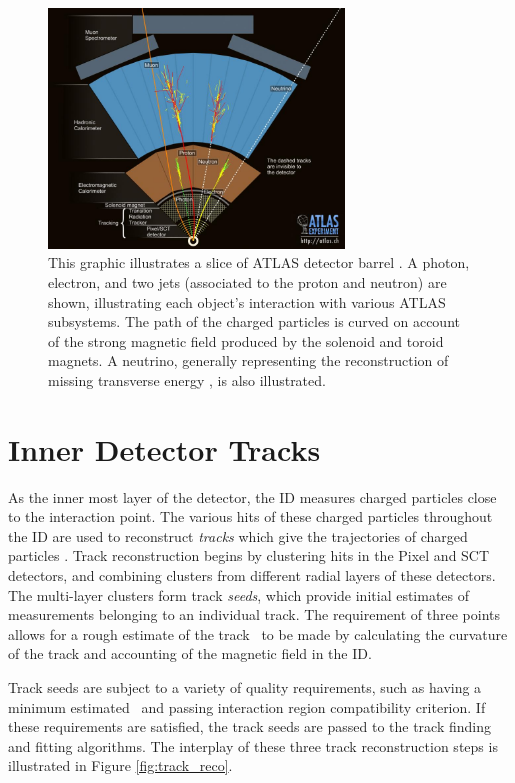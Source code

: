 \begin{figure}
        \centering
	\includegraphics[width=0.7\textwidth]{figures/ch5/detector_objects}
	\caption{This graphic illustrates a slice of ATLAS detector barrel \cite{detector_events}. A photon, electron, and two jets (associated to the proton and neutron) are shown, illustrating each object's interaction with various ATLAS subsystems. The path of the charged particles is curved on account of the strong magnetic field produced by the solenoid and toroid magnets. A neutrino, generally representing the reconstruction of missing transverse energy \met, is also illustrated.}
	\label{fig:detector_objects}
\end{figure}

\section{Inner Detector Tracks}
\label{sec:inner_det_tracks}
As the inner most layer of the detector, the ID measures charged particles close to the interaction point. The various hits of these charged particles throughout the ID are used to reconstruct \textit{tracks} which give the trajectories of charged particles \cite{track_finding}. Track reconstruction begins by clustering hits in the Pixel and SCT detectors, and combining clusters from different radial layers of these detectors. The multi-layer clusters form track \textit{seeds}, which provide initial estimates of measurements belonging to an individual track. The requirement of three points allows for a rough estimate of the track \pt~to be made by calculating the curvature of the track and accounting of the magnetic field in the ID. \par

Track seeds are subject to a variety of quality requirements, such as having a minimum estimated \pt~and passing interaction region compatibility criterion. If these requirements are satisfied, the track seeds are passed to the track finding and fitting algorithms. The interplay of these three track reconstruction steps is illustrated in Figure \ref{fig:track_reco}. 


